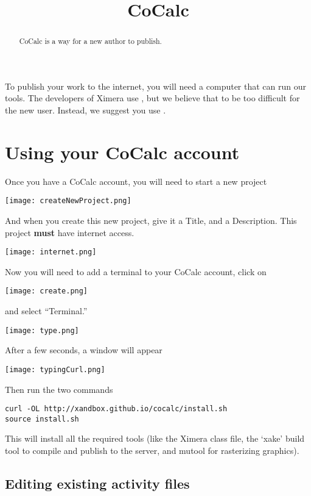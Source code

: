 \documentclass{ximera}
\title{CoCalc}
\begin{document}
\begin{abstract}
CoCalc is a way for a new author to publish.
\end{abstract}
\maketitle

To publish your work to the internet, you will need a computer that
can run our tools. The developers of Ximera use , but we believe that to be too
difficult for the new user. Instead, we suggest you use
.



\section{Using your CoCalc account}


Once you have a CoCalc account, you will need to start a new project

\begin{image}
  \texttt{[image: createNewProject.png]}
\end{image}

And when you create this new project, give it a Title, and a
Description. This project \textbf{must} have internet access.
\begin{image}
  \texttt{[image: internet.png]}
\end{image}
Now you will need to add a terminal to your CoCalc account, click on
\begin{image}
  \texttt{[image: create.png]}
\end{image}
and select ``Terminal.'' 
\begin{image}
  \texttt{[image: type.png]}
\end{image}
After a few seconds, a window will appear
\begin{image}
  \texttt{[image: typingCurl.png]}
\end{image}
Then run the two commands
\begin{verbatim}
curl -OL http://xandbox.github.io/cocalc/install.sh
source install.sh

\end{verbatim}
This will install all the required tools (like the Ximera class file,
the `xake' build tool to compile and publish to the server, and mutool
for rasterizing graphics).


\subsection{Editing existing activity files}
\end{document}

